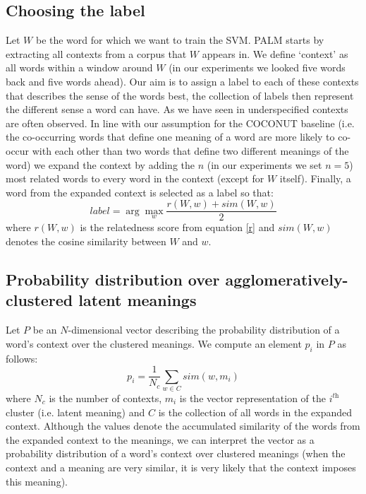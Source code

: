 \documentclass[11pt]{article}
\begin{document}
\subsection{Choosing the label}
Let $W$ be the word for which we want to train the SVM. PALM starts by extracting all contexts from a corpus that $W$ appears in. We define `context' as all words within a window around $W$ (in our experiments we looked five words back and five words ahead). Our aim is to assign a label to each of these contexts that describes the sense of the words best, the collection of labels then represent the different sense a word can have. As we have seen in \cite{analysis} underspecified contexts are often observed. In line with our assumption for the COCONUT baseline (i.e. the co-occurring words that define one meaning of a word are more likely to co-occur with each other than two words that define two different meanings of the word) we expand the context by adding the $n$ (in our experiments we set $n=5$) most related words to every word in the context (except for $W$ itself). Finally, a word from the expanded context is selected as a label so that:
\begin{equation}\label{label}label = \arg\max_w \frac{r(W, w) + \textit{sim}(W, w)}{2}\end{equation}
where $r(W, w)$ is the relatedness score from equation \ref{r} and $\textit{sim}(W, w)$ denotes the cosine similarity between $W$ and $w$. 

\subsection{Probability distribution over agglomeratively-clustered latent meanings}
Let $P$ be an $N$-dimensional vector describing the probability distribution of a word's context over the clustered meanings. We compute an element $p_i$ in $P$ as follows:
\begin{equation}\label{pa}p_i = \frac{1}{N_c}\sum\limits_{w\in C}sim(w, m_i)\end{equation}
where $N_c$ is the number of contexts, $m_i$ is the vector representation of the $i^{\textit{th}}$ cluster (i.e. latent meaning) and $C$ is the collection of all words in the expanded context. 
Although the values denote the accumulated similarity of the words from the expanded context to the meanings, we can interpret the vector as a probability distribution of a word's context over clustered meanings (when the context and a meaning are very similar, it is very likely that the context imposes this meaning). 
\end{document}
